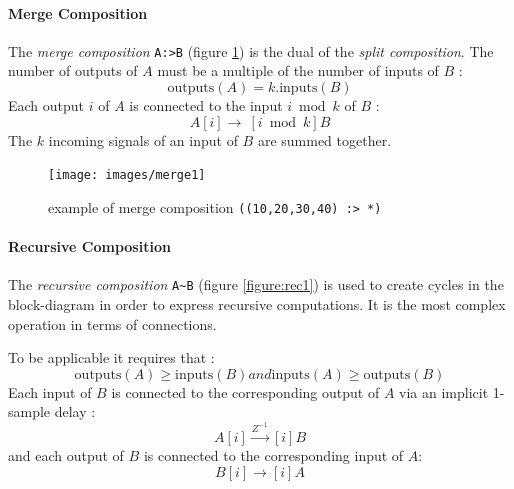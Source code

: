 \paragraph{Merge Composition}
The \emph{merge composition}  \lstinline$A:>B$ (figure \ref{figure:merge1}) is the dual of the \emph{split composition}. The number of outputs of $A$ must be a multiple of the number of inputs of $B$ : 
\begin{equation}
\mathrm{outputs}(A)=k.\mathrm{inputs}(B)                                                                                                                                                                                                                                                  \end{equation}
Each output $i$ of $A$ is connected to the input $i \bmod k$ of $B$ : 
\begin{equation}
A[i]\rightarrow\ [i \bmod k]B                                                                                                   \end{equation} 
The $k$ incoming signals of an input of $B$ are summed together.

\begin{figure}[h]
\centering 
\texttt{[image: images/merge1]} 
\caption{example of merge composition \lstinline'((10,20,30,40) :> *)'}  
\label{figure:merge1}
\end{figure}


\paragraph{Recursive Composition}
The \emph{recursive composition} \lstinline'A~B' (figure \ref{figure:rec1}) is used to create cycles in the block-diagram in order to express recursive computations. It is the most complex operation in terms of connections.

To be applicable it requires that :
\begin{equation}
\mathrm{outputs}(A) \geq \mathrm{inputs}(B) and \mathrm{inputs}(A) \geq \mathrm{outputs}(B)                                                                                               \end{equation}
Each input of $B$ is connected to the corresponding output of $A$ via an implicit 1-sample delay : 
\begin{equation}
A[i]\stackrel{Z^{-1}}{\rightarrow}[i]B
\end{equation} 
and each output of $B$ is connected to the corresponding input of $A$:
\begin{equation}
B[i]\rightarrow [i]A
\end{equation} 

